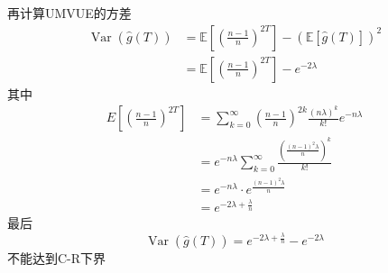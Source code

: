 \documentclass[UTF8]{ctexart}
\begin{document}
再计算UMVUE的方差
\[
\begin{aligned}
	\operatorname{Var}(\hat{g}(T) ) & =\mathbb{E}\left[\left(\frac{n-1}{n}\right)^{2 T}\right]-(\mathbb{E}[\hat{g}(T)])^2 \\
	& =\mathbb{E}\left[\left(\frac{n-1}{n}\right)^{2 T}\right]-e^{-2 \lambda}
\end{aligned}
\]
其中
\[
\begin{aligned}
	E\left[\left(\frac{n-1}{n}\right)^{2 T}\right] & =\sum_{k=0}^{\infty}\left(\frac{n-1}{n}\right)^{2 k} \frac{(n \lambda)^k}{k!} e^{-n \lambda} \\
	& =e^{-n \lambda} \sum_{k=0}^{\infty} \frac{\left( \frac{(n-1)^2 \lambda}{ n}\right) ^k}{k!}\\
	& =e^{-n \lambda} \cdot e^{\frac{(n-1)^2 \lambda}{n}} \\
	& =e^{-2 \lambda+\frac{\lambda}{n}}
\end{aligned}
\]
最后
\[
\operatorname{Var}(\hat{g}(T))=e^{-2 \lambda+\frac{\lambda}{n}}-e^{-2 \lambda}
\]
不能达到C-R下界\\
\end{document}
